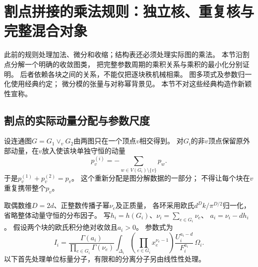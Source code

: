 \documentclass[11pt,a4paper]{ctexart}
\theoremstyle{cnplain}\newtheorem{theorem}{定理}[section]
\theoremstyle{definition}\newtheorem{definition}[theorem]{定义}
\theoremstyle{remark}\newtheorem{remark}[theorem]{注}
\begin{document}
\section{割点拼接的乘法规则：独立核、重复核与完整混合对象}
\label{sec:blockproducts}
此前的规则处理加法、微分和收缩；结构表还必须处理实际图的乘法。
本节沿割点分解一个明确的收敛图类，
把完整参数周期的乘积关系与乘积的最小化分别证明。
后者依赖各块之间的关系，不能仅把逐块秩机械相乘。
图多项式及参数归一化使用经典约定\cite[\S2,\S4]{BWpoly}；
微分模的张量与对称幂背景见\cite[\S1.5]{Singer}。
本节不对这些经典构造作新颖性宣称。

\subsection{割点的实际动量分配与参数尺度}
设连通图$G=G_1\vee_vG_2$由两图只在一个顶点$v$相交得到。
对$G_i$的非$v$顶点保留原外部动量，在$v$放入使该块单独守恒的动量
\[
 p_v^{(i)}=-\sum_{w\in V(G_i)\setminus\{v\}}p_w .
\]
于是$p_v^{(1)}+p_v^{(2)}=p_v$。
这个重新分配是图分解数据的一部分；
不得让每个块在$v$重复携带整个$p_v$。

取偶数维$D=2d$、正整数传播子幂$\nu_e$及正质量，
各环采用欧氏$d^Dk/\pi^{D/2}$归一化，
省略整体动量守恒的分布因子。
写$h_i=h(G_i)$、$\nu_i=\sum_{e\in G_i}\nu_e$、
$a_i=\nu_i-dh_i$。
假设两个块的欧氏积分绝对收敛且$a_i>0$。
参数式为
\[
 I_i=\frac{\Gamma(a_i)}{\prod_{e\in G_i}\Gamma(\nu_e)}
 \int_{\Delta_i}
   \left(\prod_{e\in G_i}x_e^{\nu_e-1}\right)
   \frac{U_i^{a_i-d}}{F_i^{a_i}}\,\Omega_i .
\]
以下首先处理单位标量分子，有限和的分离分子另由线性性处理。
\end{document}
